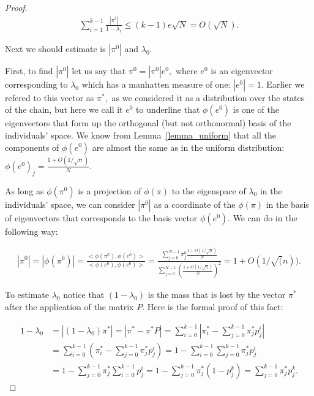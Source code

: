 \documentclass{article}
\begin{document}
\begin{proof}
\begin{align*}
  \sum\limits_{i = 1}^{k - 1} \frac{|\pi^i|}{1 - \lambda_i} \le (k - 1)e\sqrt{N} = O(\sqrt{N}).
\end{align*}

Next we should estimate is $|\pi^0|$ and $\lambda_0$.

First, to find $|\pi^0|$ let us say that $\pi^0 = |\pi^0|e^0,$ where $e^0$ is an eigenvector corresponding to $\lambda_0$ which has a manhatten measure of one: $|e^0| = 1$. Earlier we refered to this vector as $\pi^*,$ as we considered it as a distribution over the states of the chain, but here we call it $e^0$ to underline that $\phi(e^0)$ is one of the eigenvectors that form up the orthogonal (but not orthonormal) basis of the individuals' space. We know from Lemma~\ref{lemma_uniform} that all the components of $\phi(e^0)$ are almost the same as in the uniform distribution: $\phi(e^0)_j = \frac{1 + O(1/\sqrt{n})}{N}.$

As long as $\phi(\pi^0)$ is a projection of $\phi(\pi)$ to the eigenspace of $\lambda_0$ in the individuals' space, we can consider $|\pi^0|$ as a coordinate of the $\phi(\pi)$ in the basis of eigenvectors that corresponds to the basis vector $\phi(e^0).$ We can do in the following way:

\begin{align*}
  |\pi^0| = |\phi(\pi^0)| = \frac{<\phi(\pi^0), \phi(e^0)>}{<\phi(e^0), \phi(e^0)>} = \frac{\sum\limits_{j = 0}^{N - 1} \pi_j^0 \frac{1 + O(1/\sqrt{n})}{N}}{\sum\limits_{j = 0}^{N - 1} \left( \frac{1 + O(1/\sqrt{n})}{N}\right)^2} = 1 + O(1/\sqrt(n)).
\end{align*}

To estimate $\lambda_0$ notice that $(1 - \lambda_0)$ is the mass that is lost by the vector $\pi^*$ after the application of the matrix $P.$ Here is the formal proof of this fact:

\begin{align*}
  1 - \lambda_0 &= |(1 - \lambda_0)\pi^*| = |\pi^* - \pi^* P| = \sum\limits_{i = 0}^{k - 1} |\pi_i^* - \sum\limits_{j = 0}^{k - 1} \pi_j^* p_j^i| \\
  &= \sum\limits_{i = 0}^{k - 1} (\pi_i^* - \sum\limits_{j = 0}^{k - 1} \pi_j^* p_j^i) = 1 - \sum\limits_{i = 0}^{k - 1} \sum\limits_{j = 0}^{k - 1} \pi_j^* p_j^i \\
  &= 1 - \sum\limits_{j = 0}^{k - 1} \pi_j^* \sum\limits_{i = 0}^{k - 1} p_j^i = 1 - \sum\limits_{j = 0}^{k - 1} \pi_j^* (1 - p_j^k) = \sum\limits_{j = 0}^{k - 1} \pi_j^* p_j^k.
\end{align*}


\end{proof}
\end{document}
